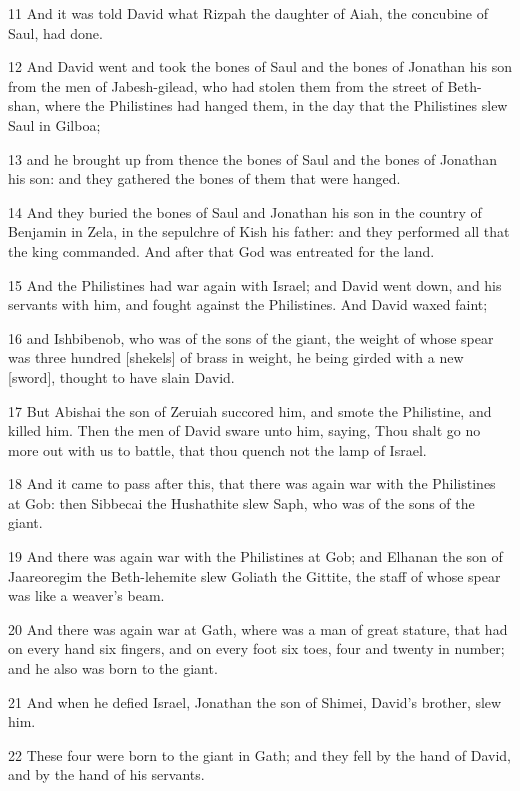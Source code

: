 \par 11 And it was told David what Rizpah the daughter of Aiah, the concubine of Saul, had done.
\par 12 And David went and took the bones of Saul and the bones of Jonathan his son from the men of Jabesh-gilead, who had stolen them from the street of Beth-shan, where the Philistines had hanged them, in the day that the Philistines slew Saul in Gilboa;
\par 13 and he brought up from thence the bones of Saul and the bones of Jonathan his son: and they gathered the bones of them that were hanged.
\par 14 And they buried the bones of Saul and Jonathan his son in the country of Benjamin in Zela, in the sepulchre of Kish his father: and they performed all that the king commanded. And after that God was entreated for the land.
\par 15 And the Philistines had war again with Israel; and David went down, and his servants with him, and fought against the Philistines. And David waxed faint;
\par 16 and Ishbibenob, who was of the sons of the giant, the weight of whose spear was three hundred [shekels] of brass in weight, he being girded with a new [sword], thought to have slain David.
\par 17 But Abishai the son of Zeruiah succored him, and smote the Philistine, and killed him. Then the men of David sware unto him, saying, Thou shalt go no more out with us to battle, that thou quench not the lamp of Israel.
\par 18 And it came to pass after this, that there was again war with the Philistines at Gob: then Sibbecai the Hushathite slew Saph, who was of the sons of the giant.
\par 19 And there was again war with the Philistines at Gob; and Elhanan the son of Jaareoregim the Beth-lehemite slew Goliath the Gittite, the staff of whose spear was like a weaver's beam.
\par 20 And there was again war at Gath, where was a man of great stature, that had on every hand six fingers, and on every foot six toes, four and twenty in number; and he also was born to the giant.
\par 21 And when he defied Israel, Jonathan the son of Shimei, David's brother, slew him.
\par 22 These four were born to the giant in Gath; and they fell by the hand of David, and by the hand of his servants.

